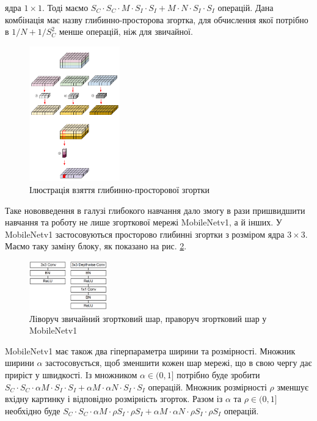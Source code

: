 ядра $1 \times 1$. Тоді маємо
$S_C \cdot  S_C \cdot  M \cdot  S_I \cdot  S_I + M \cdot  N \cdot  S_I \cdot  S_I$ операцій.
Дана комбінація має назву глибинно-просторова згортка, для
обчислення якої потрібно в $1/N + 1/S_C^2$ менше операцій, ніж
для звичайної.
\begin{figure}[H]
    \centering
    \includegraphics[width=0.35\textwidth]{images/cnn_deep_wise_separable_conv}
    \caption{Ілюстрація взяття глибинно-просторової згортки  \cite{deep_wise_sep_conv_website}
        \label{fig:cnn:deep_wise_sep_conv}
    }
\end{figure}

Таке нововведення в галузі глибокого навчання дало змогу в рази пришвидшити
навчання та роботу не лише згорткової мережі MobileNetv1, а й інших. У MobileNetv1 застосовуються
просторово глибинні згортки з розміром ядра $3 \times 3$.
Маємо таку заміну блоку, як показано на рис. \ref{fig:cnn:mobilenetv1_conv_layer}.

\begin{figure}[H]
    \centering
    \includegraphics[width=0.3\textwidth]{images/cnn_mobilenetv1_conv_layer}
    \caption{Ліворуч звичайний згортковий шар,
        праворуч згортковий шар у MobileNetv1  \cite{mobilenetv1}
        \label{fig:cnn:mobilenetv1_conv_layer}
    }
\end{figure}

MobileNetv1 має також два гіперпараметра ширини та розмірності.
Множник ширини $\alpha$ застосовується, щоб зменшити кожен шар мережі, що
в свою чергу дає приріст у швидкості.
Iз множником  $\alpha \in (0,1]$ потрібно буде зробити
$S_C \cdot  S_C \cdot  \alpha M \cdot  S_I \cdot  S_I + \alpha M \cdot  \alpha N \cdot  S_I \cdot  S_I$ операцій.
Множник розмірності $\rho$ зменшує вхідну картинку і відповідно
розмірність згорток. Разом із $\alpha$ та $\rho \in (0,1]$ необхідно буде
$S_C \cdot  S_C \cdot  \alpha M \cdot  \rho S_I \cdot  \rho S_I + \alpha M \cdot \alpha  N \cdot  \rho S_I \cdot  \rho S_I$
операцій.


